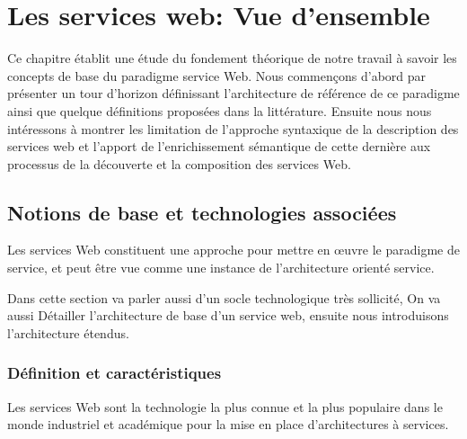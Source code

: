 

\chapter{Les services web: Vue d'ensemble}
Ce chapitre établit une étude du fondement théorique de notre travail
à savoir les concepts de base du paradigme service Web.  Nous
commençons d'abord par présenter un tour d'horizon définissant
l'architecture de référence de ce paradigme ainsi que quelque
définitions proposées dans la littérature. Ensuite nous nous
intéressons à montrer les limitation de l'approche syntaxique de la
description des services web et l'apport de l'enrichissement
sémantique de cette dernière aux processus de la découverte et la
composition des services Web.\\

\newpage

  \section{Notions de base et technologies associées} 

  Les services Web constituent une approche pour mettre en œuvre le
  paradigme de service, et peut être vue comme une instance de
  l'architecture orienté service.
  
  Dans cette section va parler aussi d'un socle technologique très
  sollicité, On va aussi Détailler l'architecture de base d'un service
  web, ensuite nous introduisons l'architecture étendus.


    \subsection{Définition et caractéristiques }
    Les services Web sont la technologie la plus connue et la plus
    populaire dans le monde industriel et académique pour la mise en place
    d’architectures à services.

